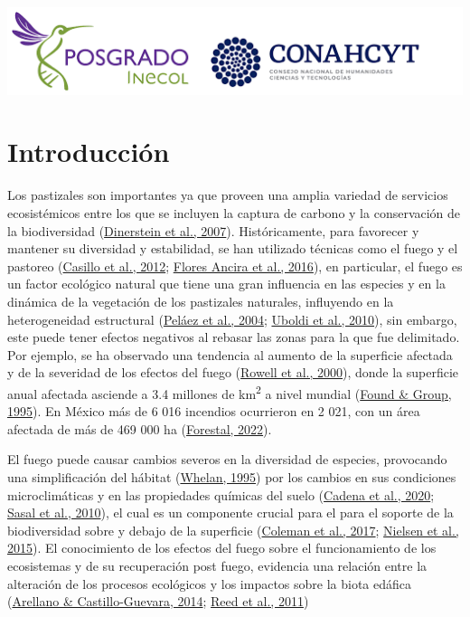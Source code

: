 \documentclass[
  11pt,
  a4paper]{book}
\begin{document}
\begin{center}\includegraphics[width=7.1in]{images/Inecol} \end{center}

\hypertarget{introducciuxf3n}{%
\chapter{Introducción}\label{introducciuxf3n}}

Los pastizales son importantes ya que proveen una amplia variedad de servicios ecosistémicos entre los que se incluyen la captura de carbono y la conservación de la biodiversidad (\protect\hyperlink{ref-dinerstein2007resena}{Dinerstein et al., 2007}). Históricamente, para favorecer y mantener su diversidad y estabilidad, se han utilizado técnicas como el fuego y el pastoreo (\protect\hyperlink{ref-casillo2012quemas}{Casillo et al., 2012}; \protect\hyperlink{ref-flores2016efecto}{Flores Ancira et al., 2016}), en particular, el fuego es un factor ecológico natural que tiene una gran influencia en las especies y en la dinámica de la vegetación de los pastizales naturales, influyendo en la heterogeneidad estructural (\protect\hyperlink{ref-pelaezincendios}{Peláez et al., 2004}; \protect\hyperlink{ref-uboldi2010analisis}{Uboldi et al., 2010}), sin embargo, este puede tener efectos negativos al rebasar las zonas para la que fue delimitado. Por ejemplo, se ha observado una tendencia al aumento de la superficie afectada y de la severidad de los efectos del fuego (\protect\hyperlink{ref-rowell2000global}{Rowell et al., 2000}), donde la superficie anual afectada asciende a 3.4 millones de km\textsuperscript{2} a nivel mundial (\protect\hyperlink{ref-wwf1995}{Found \& Group, 1995}). En México más de 6 016 incendios ocurrieron en 2 021, con un área afectada de más de 469 000 ha (\protect\hyperlink{ref-conafor2022}{Forestal, 2022}).

El fuego puede causar cambios severos en la diversidad de especies, provocando una simplificación del hábitat (\protect\hyperlink{ref-whelan1995ecology}{Whelan, 1995}) por los cambios en sus condiciones microclimáticas y en las propiedades químicas del suelo (\protect\hyperlink{ref-cadena2020efecto}{Cadena et al., 2020}; \protect\hyperlink{ref-sasal2010succession}{Sasal et al., 2010}), el cual es un componente crucial para el para el soporte de la biodiversidad sobre y debajo de la superficie (\protect\hyperlink{ref-coleman2017fundamentals}{Coleman et al., 2017}; \protect\hyperlink{ref-nielsen2015soil}{Nielsen et al., 2015}). El conocimiento de los efectos del fuego sobre el funcionamiento de los ecosistemas y de su recuperación post fuego, evidencia una relación entre la alteración de los procesos ecológicos y los impactos sobre la biota edáfica (\protect\hyperlink{ref-arellano2014efecto}{Arellano \& Castillo-Guevara, 2014}; \protect\hyperlink{ref-reed2011functional}{Reed et al., 2011})
\end{document}
